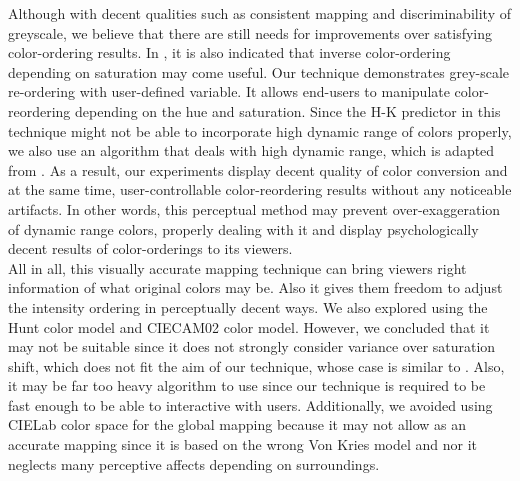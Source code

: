 \documentclass{article}
\begin{document}
 Although with decent qualities such as consistent mapping and discriminability of greyscale,  we believe that there are still needs for improvements over satisfying color-ordering results. In \cite{kim09_c2g}, it is also indicated that inverse color-ordering depending on saturation may come useful. Our technique demonstrates grey-scale re-ordering with user-defined variable. It allows end-users to manipulate color-reordering depending on the hue and saturation. Since the H-K predictor in this technique might not be able to incorporate high dynamic range of colors properly, we also use an algorithm that deals with high dynamic range, which is adapted from \cite{journals/pr/GrundlandD07}. As a result, our experiments display decent quality of color conversion and at the same time, user-controllable color-reordering results without any noticeable artifacts. In other words, this perceptual method may prevent over-exaggeration of dynamic range colors, properly dealing with it and display psychologically decent results of color-orderings to its viewers. \\
 All in all, this visually accurate mapping technique can bring viewers right information of what original colors may be. Also it gives them freedom to adjust the intensity ordering in perceptually decent ways. We also explored using the Hunt color model \cite{Hunt} and CIECAM02 color model. However, we concluded that it may not be suitable since it does not strongly consider variance over saturation shift, which does not fit the aim of our technique, whose case is similar to \cite{Smith_apparentgreyscale}. Also, it may be far too heavy algorithm to use since our technique is required to be fast enough to be able to interactive with users. Additionally, we avoided using CIELab color space for the global mapping because it may not allow as an accurate mapping since it is based on the wrong Von Kries model and nor it neglects many perceptive affects depending on surroundings.\cite{Fairchild2004_1}
\end{document}
